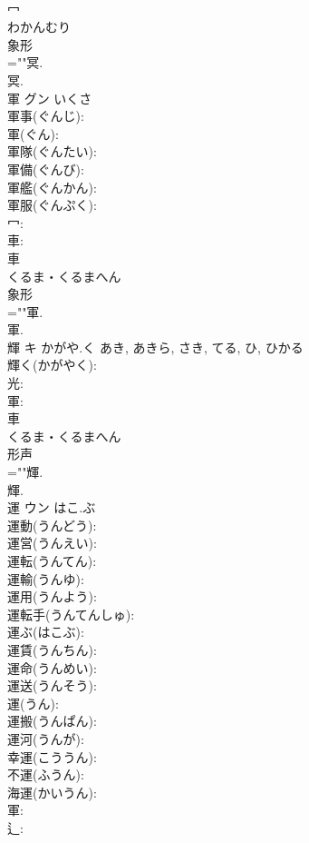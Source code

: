 \documentclass[8pt]{extreport}
\begin{document}
\begin{CJK}{UTF8}{min}
\\	冖	
\\	わかんむり	
\\	象形 
\\	=""冥.
\\	冥.
\\	軍	グン	いくさ		
\\	軍事(ぐんじ): 
\\	軍(ぐん): 
\\	軍隊(ぐんたい): 
\\	軍備(ぐんび): 
\\	軍艦(ぐんかん): 
\\	軍服(ぐんぷく): 
\\	冖: 
\\	車: 
\\	車	
\\	くるま・くるまへん	
\\	象形 
\\	=""軍.
\\	軍.
\\	輝	キ	かがや.く	あき, あきら, さき, てる, ひ, ひかる	
\\	輝く(かがやく): 
\\	光: 
\\	軍: 
\\	車	
\\	くるま・くるまへん	
\\	形声 
\\	=""輝.
\\	輝.
\\	運	ウン	はこ.ぶ		
\\	運動(うんどう): 
\\	運営(うんえい): 
\\	運転(うんてん): 
\\	運輸(うんゆ): 
\\	運用(うんよう): 
\\	運転手(うんてんしゅ): 
\\	運ぶ(はこぶ): 
\\	運賃(うんちん): 
\\	運命(うんめい): 
\\	運送(うんそう): 
\\	運(うん): 
\\	運搬(うんぱん): 
\\	運河(うんが): 
\\	幸運(こううん): 
\\	不運(ふうん): 
\\	海運(かいうん): 
\\	軍: 
\\	辶: 

\end{CJK}
\end{document}
